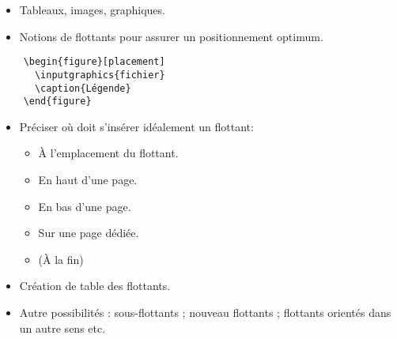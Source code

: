 \begin{slide}
  \begin{itemize}
    \item Tableaux, images, graphiques.
    \item Notions de flottants pour assurer un positionnement optimum.
  \end{itemize}
\end{slide}

\begin{slide}
  \begin{verbatim}
    \begin{figure}[placement]
      \inputgraphics{fichier}
      \caption{Légende}
    \end{figure}
  \end{verbatim}
\end{slide}

\begin{slide}
  \begin{itemize}
    \item Préciser où doit s'insérer idéalement un flottant:
      \begin{itemize}
	\item À l'emplacement du flottant.
	\item En haut d'une page.
	\item En bas d'une page.
	\item Sur une page dédiée.
	\item (À la fin)
      \end{itemize}
    \item Création de table des flottants.
    \item Autre possibilités : sous-flottants ; nouveau flottants ; flottants orientés dans un autre sens etc.
  \end{itemize}
\end{slide}
